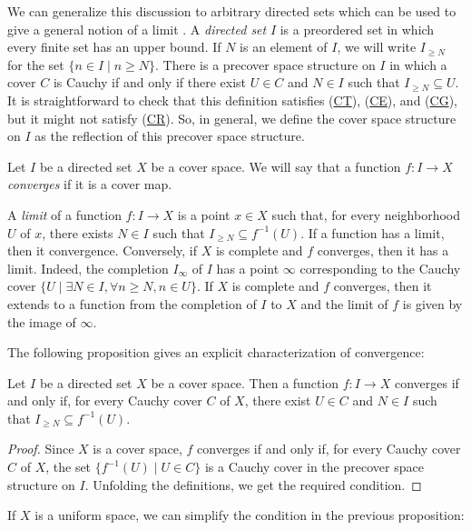 \documentclass[reqno]{amsart}
\newcommand{\axref}[1]{(\hyperref[ax:#1]{#1})}
\theoremstyle{definition}
\theoremstyle{remark}
\numberwithin{figure}{section}
\begin{document}
We can generalize this discussion to arbitrary directed sets which can be used to give a general notion of a limit \cite{limits}.
A \emph{directed set} $I$ is a preordered set in which every finite set has an upper bound.
If $N$ is an element of $I$, we will write $I_{\geq N}$ for the set $\{ n \in I \mid n \geq N \}$.
There is a precover space structure on $I$ in which a cover $C$ is Cauchy if and only if there exist $U \in C$ and $N \in I$ such that $I_{\geq N} \subseteq U$.
It is straightforward to check that this definition satisfies \axref{CT}, \axref{CE}, and \axref{CG}, but it might not satisfy \axref{CR}.
So, in general, we define the cover space structure on $I$ as the reflection of this precover space structure.

\begin{defn}
Let $I$ be a directed set $X$ be a cover space.
We will say that a function $f : I \to X$ \emph{converges} if it is a cover map.
\end{defn}

A \emph{limit} of a function $f : I \to X$ is a point $x \in X$ such that, for every neighborhood $U$ of $x$, there exists $N \in I$ such that $I_{\geq N} \subseteq f^{-1}(U)$.
If a function has a limit, then it convergence.
Conversely, if $X$ is complete and $f$ converges, then it has a limit.
Indeed, the completion $I_\infty$ of $I$ has a point $\infty$ corresponding to the Cauchy cover $\{ U \mid \exists N \in I, \forall n \geq N, n \in U \}$.
If $X$ is complete and $f$ converges, then it extends to a function from the completion of $I$ to $X$ and the limit of $f$ is given by the image of $\infty$.

The following proposition gives an explicit characterization of convergence:

\begin{prop}
Let $I$ be a directed set $X$ be a cover space.
Then a function $f : I \to X$ converges if and only if, for every Cauchy cover $C$ of $X$, there exist $U \in C$ and $N \in I$ such that $I_{\geq N} \subseteq f^{-1}(U)$.
\end{prop}
\begin{proof}
Since $X$ is a cover space, $f$ converges if and only if, for every Cauchy cover $C$ of $X$, the set $\{ f^{-1}(U) \mid U \in C \}$ is a Cauchy cover in the precover space structure on $I$.
Unfolding the definitions, we get the required condition.
\end{proof}

If $X$ is a uniform space, we can simplify the condition in the previous proposition:
\end{document}
